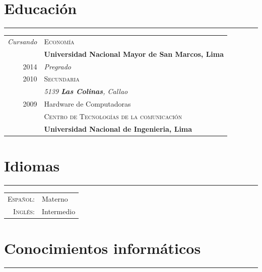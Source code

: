 \documentclass[a4paper,10pt]{article}
\begin{document}
\section{Educación}
\hrule
	\begin{tabular}{r|p{11cm}}
					\emph{Cursando}          & \textsc{Economía}\\
														 & \textbf{Universidad Nacional Mayor de San Marcos, Lima} \\
					\textsc{2014}            & \emph{Pregrado}\\

					\textsc{2010}            & \textsc{Secundaria} \\
														 & \emph{5139 \textbf{Las Colinas}, Callao} \\

					\textsc{2009}            & Hardware de Computadoras\\
														 & \textsc{Centro de Tecnologías de la comunicación}\\
														 & \textbf{Universidad Nacional de Ingenieria, Lima}
	\end{tabular}


\section{Idiomas}
\hrule
	\begin{tabular}{rl}
 		\textsc{Español:} & Materno\\
 		\textsc{Inglés:}  & Intermedio\\
	\end{tabular}

\section{Conocimientos informáticos}
\hrule
\end{document}
